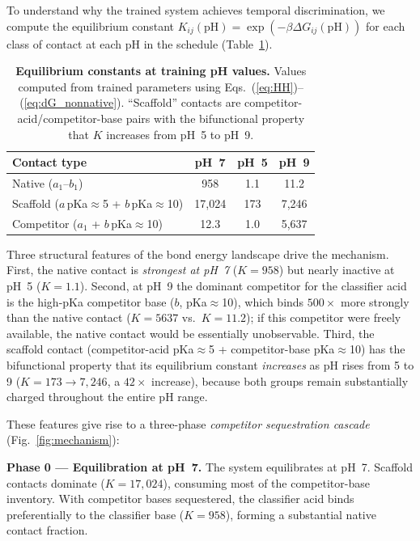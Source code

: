 \documentclass[10pt,twocolumn]{article}
\begin{document}
To understand why the trained system achieves temporal discrimination, we compute the equilibrium constant $K_{ij}(\mathrm{pH}) = \exp(-\beta\Delta G_{ij}(\mathrm{pH}))$ for each class of contact at each pH in the schedule (Table~\ref{tab:bonds}).

\begin{table}[H]
  \centering
  \small
  \caption{\textbf{Equilibrium constants at training pH values.}
    Values computed from trained parameters using
    Eqs.~(\ref{eq:HH})--(\ref{eq:dG_nonnative}).
    ``Scaffold'' contacts are competitor-acid/competitor-base pairs
    with the bifunctional property that $K$ increases from pH~5 to pH~9.}
  \label{tab:bonds}
  \setlength{\tabcolsep}{4pt}
  \begin{tabular}{lccc}
    \toprule
    Contact type & pH~7 & pH~5 & pH~9 \\
    \midrule
    Native ($a_1$--$b_1$) & 958 & 1.1 & 11.2 \\
    Scaffold ($a$\,pKa$\approx$5 + $b$\,pKa$\approx$10) & 17{,}024 & 173 & 7{,}246 \\
    Competitor ($a_1$ + $b$\,pKa$\approx$10) & 12.3 & 1.0 & 5{,}637 \\
    \bottomrule
  \end{tabular}
\end{table}

Three structural features of the bond energy landscape drive the mechanism.
First, the native contact is \emph{strongest at pH~7} ($K=958$) but nearly inactive at pH~5 ($K=1.1$).
Second, at pH~9 the dominant competitor for the classifier acid is the high-pKa competitor base ($b$, pKa$\approx$10), which binds $500\times$ more strongly than the native contact ($K=5637$ vs.\ $K=11.2$); if this competitor were freely available, the native contact would be essentially unobservable.
Third, the scaffold contact (competitor-acid pKa$\approx$5 + competitor-base pKa$\approx$10) has the bifunctional property that its equilibrium constant \emph{increases} as pH rises from 5 to 9 ($K = 173 \to 7{,}246$, a $42\times$ increase), because both groups remain substantially charged throughout the entire pH range.

These features give rise to a three-phase \emph{competitor sequestration cascade} (Fig.~\ref{fig:mechanism}):

\textbf{Phase 0 — Equilibration at pH~7.}
The system equilibrates at pH~7.
Scaffold contacts dominate ($K=17{,}024$), consuming most of the competitor-base inventory.
With competitor bases sequestered, the classifier acid binds preferentially to the classifier base ($K=958$), forming a substantial native contact fraction.
\end{document}

